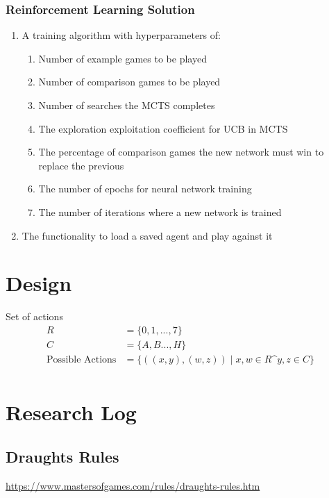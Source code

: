 \documentclass{article}
\begin{document}
    \subsubsection{Reinforcement Learning Solution} \label{RLS Objs}
    \begin{enumerate}
        \item A training algorithm with hyperparameters of:
        \begin{enumerate}
            \item Number of example games to be played
            \item Number of comparison games to be played
            \item Number of searches the MCTS completes
            \item The exploration exploitation coefficient for UCB in MCTS
            \item The percentage of comparison games the new network must win to replace the previous
            \item The number of epochs for neural network training
            \item The number of iterations where a new network is trained
        \end{enumerate}
        \item The functionality to load a saved agent and play against it
    \end{enumerate}

    \section{Design}
    
    Set of actions
    \begin{align}
        R &= \{0,1, ... ,7\}\\
        C &= \{A, B ..., H\}\\
        \text{Possible Actions} &= \{((x,y), (w,z)) \mid x, w \in R \text{^} y,z \in C\}\\
    \end{align}

    \section{Research Log}

    \subsection{Draughts Rules}
    \url{https://www.mastersofgames.com/rules/draughts-rules.htm}
\end{document}
